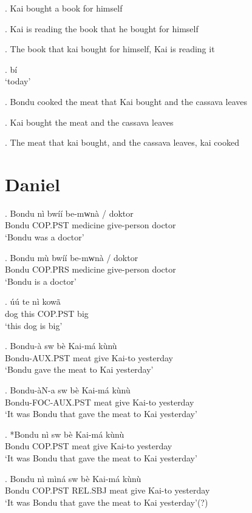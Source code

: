 \documentclass{assets/fieldnotes}
\begin{document}
\ex. Kai bought a book for himself 

\ex. Kai is reading the book that he bought for himself 

\ex. The book that kai bought for himself, Kai is reading it

\exg. bí \\
`today'

\ex. Bondu cooked the meat that Kai bought and the cassava leaves 

\ex. Kai bought the meat and the cassava leaves 

\ex. The meat that kai bought, and the cassava leaves, kai cooked

\section{Daniel}
\exg. Bondu nì bwíí be-mᴡnà / doktor\\
Bondu COP.PST medicine give-person {} doctor\\
`Bondu was a doctor'

\exg. Bondu mù bwíí be-mᴡnà / doktor\\
Bondu COP.PRS medicine give-person {} doctor\\
`Bondu is a doctor'

\exg. úú te nì kowã\\
dog this COP.PST big\\
`this dog is big'

\exg. Bondu-à sw bè Kai-má kùnù\\
Bondu-AUX.PST meat give Kai-to yesterday\\
`Bondu gave the meat to Kai yesterday'

\exg. Bondu-àN-a sw bè Kai-má kùnù\\
Bondu-FOC-AUX.PST meat give Kai-to yesterday\\
`It was Bondu that gave the meat to Kai yesterday'

\exg. *Bondu nì sw bè Kai-má kùnù\\
Bondu COP.PST meat give Kai-to yesterday\\
`It was Bondu that gave the meat to Kai yesterday'

\exg. Bondu nì mìná sw bè Kai-má kùnù\\
Bondu COP.PST REL.SBJ meat give Kai-to yesterday\\
`It was Bondu that gave the meat to Kai yesterday'(?)
\end{document}
